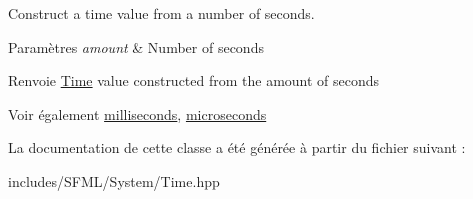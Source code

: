 Construct a time value from a number of seconds. 


\begin{DoxyParams}{Paramètres}
{\em amount} & Number of seconds\\
\hline
\end{DoxyParams}
\begin{DoxyReturn}{Renvoie}
\hyperlink{classsf_1_1Time}{Time} value constructed from the amount of seconds
\end{DoxyReturn}
\begin{DoxySeeAlso}{Voir également}
\hyperlink{classsf_1_1Time_ae379d420bc07170668f51522023957b9}{milliseconds}, \hyperlink{classsf_1_1Time_a951fd7219641f1e8191887f5dfe0dc31}{microseconds} 
\end{DoxySeeAlso}


La documentation de cette classe a été générée à partir du fichier suivant \+:\begin{DoxyCompactItemize}
\item 
includes/\+S\+F\+M\+L/\+System/Time.\+hpp\end{DoxyCompactItemize}
